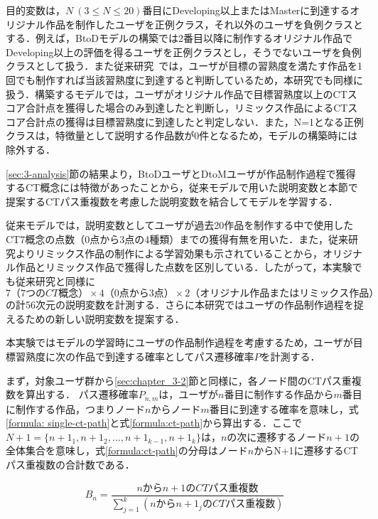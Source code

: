 \documentclass[11pt,dvipdfmx]{jreport}
\begin{document}
目的変数は，{$N~(3 \leq N \leq 20)$}番目にDeveloping以上またはMasterに到達するオリジナル作品を制作したユーザを正例クラス，それ以外のユーザを負例クラスとする．例えば，BtoDモデルの構築では2番目以降に制作するオリジナル作品でDeveloping以上の評価を得るユーザを正例クラスとし，そうでないユーザを負例クラスとして扱う．また従来研究~\cite{Ando_2021}では，ユーザが目標の習熟度を満たす作品を1回でも制作すれば当該習熟度に到達すると判断しているため，本研究でも同様に扱う．構築するモデルでは，ユーザがオリジナル作品で目標習熟度以上のCTスコア合計点を獲得した場合のみ到達したと判断し，リミックス作品によるCTスコア合計点の獲得は目標習熟度に到達したと判定しない．また，N=1となる正例クラスは，特徴量として説明する作品数が0件となるため，モデルの構築時には除外する．

\ref{sec:3-analysis}節の結果より，BtoDユーザとDtoMユーザが作品制作過程で獲得するCT概念には特徴があったことから，従来モデルで用いた説明変数と本節で提案するCTパス重複数を考慮した説明変数を結合してモデルを学習する．

従来モデルでは，説明変数としてユーザが過去20作品を制作する中で使用したCT7概念の点数（0点から3点の4種類）までの獲得有無を用いた．また，従来研究\cite{Dasgupta_2016}よりリミックス作品の制作による学習効果も示されていることから，オリジナル作品とリミックス作品で獲得した点数を区別している．したがって，本実験でも従来研究と同様に$7（7つのCT概念） \times 4（0点から3点） \times 2（オリジナル作品またはリミックス作品）$の計56次元の説明変数を計測する．さらに本研究ではユーザの作品制作過程を捉えるための新しい説明変数を提案する．

本実験ではモデルの学習時にユーザの作品制作過程を考慮するため，ユーザが目標習熟度に次の作品で到達する確率としてパス遷移確率$P$を計測する．

まず，対象ユーザ群から\ref{sec:chapter_3-2}節と同様に，各ノード間のCTパス重複数を算出する．
パス遷移確率$P_{n,m}$は，ユーザが$n$番目に制作する作品から$m$番目に制作する作品，つまりノード$n$からノード$m$番目に到達する確率を意味し，式\ref{formula: single-ct-path}と式\ref{formula:ct-path}から算出する．ここで$N+1=\{ {n + 1}_1, {n + 1}_2,\ldots,{n + 1}_{k-1}, {n + 1}_k  \}$は，$n$の次に遷移するノード$n+1$の全体集合を意味し，式\ref{formula:ct-path}の分母はノード$n$からN+1に遷移するCTパス重複数の合計数である．

\begin{equation}
  B_n = \frac{nからn+1のCT
  パス重複数}{\sum_{j=1}^{k} (nからn+1_jのCTパス重複数)} \label{formula: single-ct-path}
\end{equation}

\end{document}
